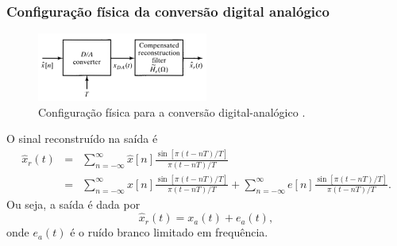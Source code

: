 \begin{frame}[allowframebreaks]
  \frametitle{Configuração física da conversão digital analógico}
  \begin{figure}[h!]
  \centering
  \includegraphics[width=0.5\textwidth]{images/oppenheim_fig455.png}
  \caption{Configuração física para a conversão digital-analógico \citep{oppenheim2009}.}
  \label{fig:oppenheim_fig455}
  \end{figure}

  \framebreak 
  O sinal reconstruído na saída é
  \begin{eqnarray}
  \hat{x}_r (t) &=& \sum_{n=-\infty}^{\infty} \hat{x}[n] \frac{\sin [\pi (t - nT)/T]}{\pi (t - nT)/T} \\
                &=& \sum_{n=-\infty}^{\infty} x[n] \frac{\sin [\pi (t - nT)/T]}{\pi (t - nT)/T} + 
                    \sum_{n=-\infty}^{\infty} e[n] \frac{\sin [\pi (t - nT)/T]}{\pi (t - nT)/T} . \nonumber
  \end{eqnarray}
  Ou seja, a saída é dada por 
  \begin{equation}
  \hat{x}_r (t) = x_a(t) + e_a(t),
  \end{equation}
  onde $e_a(t)$ é o ruído branco limitado em frequência.

\end{frame}


